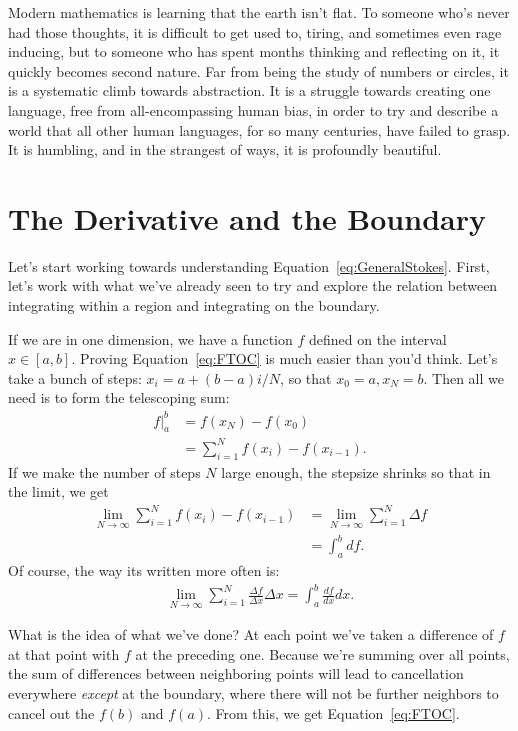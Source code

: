 	
	Modern mathematics is learning that the earth isn't flat. To someone who's never had those thoughts, it is difficult to get used to, tiring, and sometimes even rage inducing, but to someone who has spent months thinking and reflecting on it, it quickly becomes second nature. Far from being the study of numbers or circles, it is a systematic climb towards abstraction.  It is a struggle towards creating one language, free from all-encompassing human bias, in order to try and describe a world that all other human languages, for so many centuries, have failed to grasp. It is humbling, and in the strangest of ways, it is profoundly beautiful.



\section{The Derivative and the Boundary}

	Let's start working towards understanding Equation~\eqref{eq:GeneralStokes}. First, let's work with what we've already seen to try and explore the relation between integrating within a region and integrating on the boundary. 
	
	If we are in one dimension, we have a function $f$ defined on the interval $x \in [a,b]$. Proving Equation~\eqref{eq:FTOC} is much easier than you'd think. Let's take a bunch of steps: $x_i = a + (b-a)i/N$, so that $x_0 = a, x_N = b$. Then all we need is to form the telescoping sum:	
	\begin{align*}
		f\rvert^b_a &= f(x_N) - f(x_0) \\& = \sum_{i=1}^N f(x_{i})-f(x_{i-1}).
	\end{align*}
	If we make the number of steps $N$ large enough, the stepsize shrinks so that in the limit, we get
	\begin{align*}
		\lim_{N \rightarrow \infty} 	\sum_{i=1}^N f(x_{i})-f(x_{i-1}) & = \lim_{N \rightarrow \infty} 	\sum_{i=1}^N \Delta f \\ & = \int_a^b df.
	\end{align*}
	Of course, the way its written more often is:
	\begin{align*}
		\lim_{N \rightarrow \infty} 	\sum_{i=1}^N \frac{\Delta f}{\Delta x} \Delta x  = \int_{a}^{b} \frac{df}{dx} dx.
	\end{align*}
	
	What is the idea of what we've done? At each point we've taken a difference of $f$ at that point with $f$ at the preceding one. Because we're summing over all points, the sum of differences between neighboring points will lead to cancellation everywhere \emph{except} at the boundary, where there will not be further neighbors to cancel out the $f(b)$ and $f(a)$. From this, we get Equation~\eqref{eq:FTOC}. 
	
